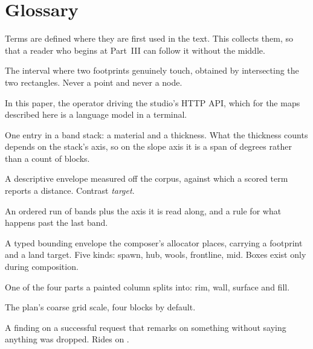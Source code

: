 \chapter{Glossary}
\label{app:glossary}

Terms are defined where they are first used in the text. This collects them, so
that a reader who begins at Part~III can follow it without the middle.

\begin{description}[leftmargin=0pt,style=nextline,itemsep=3pt,font=\normalfont\sffamily\bfseries]

\item[Abutment] The interval where two footprints genuinely touch, obtained by
  intersecting the two rectangles. Never a point and never a node.

\item[Agent] In this paper, the operator driving the studio's HTTP API, which for
  the maps described here is a language model in a terminal.

\item[Band (paint)] One entry in a band stack: a material and a thickness. What the
  thickness counts depends on the stack's axis, so on the slope axis it is a span of
  degrees rather than a count of blocks.

\item[Band (rule)] A descriptive envelope measured off the corpus, against which a
  scored term reports a distance. Contrast \emph{target}.

\item[Band stack] An ordered run of bands plus the axis it is read along, and a rule
  for what happens past the last band.

\item[Box] A typed bounding envelope the composer's allocator places, carrying a
  footprint and a land target. Five kinds: spawn, hub, wools, frontline, mid. Boxes
  exist only during composition.

\item[Bucket] One of the four parts a painted column splits into: rim, wall, surface
  and fill.

\item[Cell] The plan's coarse grid scale, four blocks by default.

\item[Complaint] A finding on a successful request that remarks on something without
  saying anything was dropped. Rides on .


\end{description}
